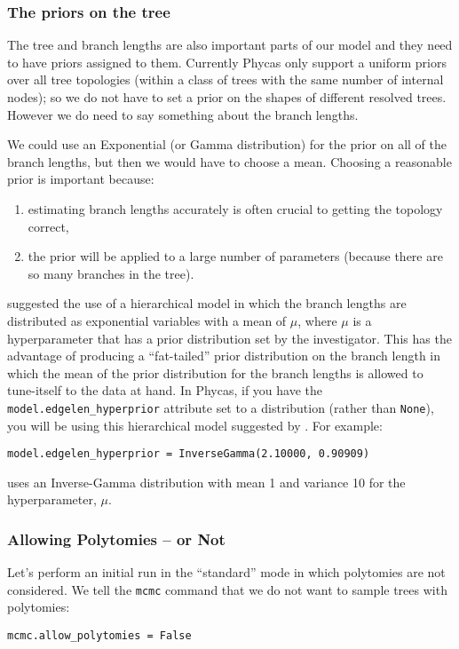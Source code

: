 \documentclass{article}
\newcommand{\cmd}[1]{\texttt{#1}\xspace}
\newcommand{\phycas}{Phycas\xspace}
\begin{document}
\subsubsection{The priors on the tree}
The tree and branch lengths are also important parts of our model and they need to have
priors assigned to them.
Currently \phycas only support a uniform priors over all tree topologies (within a
class of trees with the same number of internal nodes); so we do not have to set
a prior on the shapes of different resolved trees.
However we do need to say something about the branch lengths.

We could use an Exponential (or Gamma distribution) for the prior on all of the branch lengths, but then we would have to choose a mean.
Choosing a reasonable prior is important because:
\begin{enumerate}
	\item  estimating branch lengths accurately is often crucial to getting the topology correct,
	\item the prior will be applied to a large number of parameters (because there are so many branches in the tree).
\end{enumerate}
\citet{SuchardWS2001} suggested the use of a hierarchical model in which the branch lengths are distributed as exponential variables with a mean of $\mu$, where $\mu$ is a hyperparameter that 
has a prior distribution set by the investigator.
This has the advantage of producing a ``fat-tailed'' prior distribution on the branch length in which the 
mean of the prior distribution for the branch lengths is allowed to tune-itself to the data at hand.
In \phycas, if you have the \cmd{model.edgelen\_hyperprior} attribute set to a distribution (rather than \texttt{None}), you will be using this hierarchical model suggested by \citet{SuchardWS2001}.
For example:
\begin{verbatim}
model.edgelen_hyperprior = InverseGamma(2.10000, 0.90909)
\end{verbatim}
uses an Inverse-Gamma distribution with mean 1 and variance 10 for the hyperparameter, $\mu$.

\subsubsection{Allowing Polytomies -- or Not}
Let's perform an initial run in the ``standard'' mode in which polytomies are not considered.
We tell the \cmd{mcmc} command that we do not want to sample trees with polytomies:
\begin{verbatim}
mcmc.allow_polytomies = False
\end{verbatim}
\end{document}
